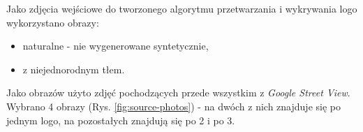 Jako zdjęcia wejściowe do tworzonego algorytmu przetwarzania i wykrywania logo wykorzystano obrazy:
\begin{itemize}
    \item naturalne - nie wygenerowane syntetycznie,
    \item z niejednorodnym tłem.
\end{itemize}
Jako obrazów użyto zdjęć pochodzących przede wszystkim z \emph{Google Street View}. Wybrano 4 obrazy (Rys. \ref{fig:source-photos}) - na dwóch z nich znajduje się po jednym logo, na pozostałych znajdują się po 2 i po 3.
